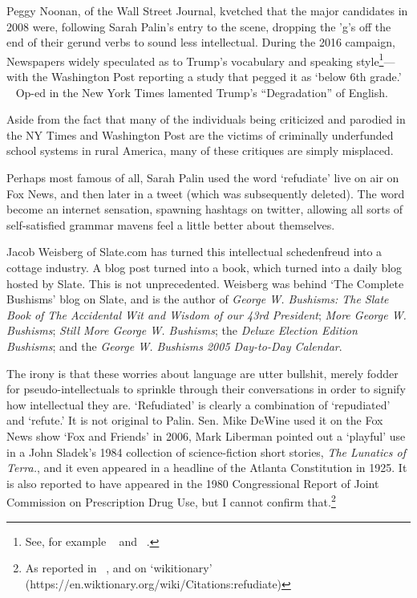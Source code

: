 Peggy Noonan, of the Wall Street Journal, kvetched that the major candidates in 2008 were, following Sarah Palin's entry to the scene, dropping the 'g's off the end of their gerund verbs to sound less intellectual. During the 2016 campaign, Newspapers widely speculated as to Trump's vocabulary and speaking style\footnote{See, for example ~\citep{Shafer:2015ug} and ~\citep{Leith:2017um}.}---with the Washington Post reporting a study that pegged it as `below 6th grade.' ~\citep{Moyer:2016us} Op-ed in the New York Times lamented Trump's ``Degradation'' of English. ~\citep{Blow:2017uk}

Aside from the fact that many of the individuals being criticized and parodied in the NY Times and Washington Post are the victims of criminally underfunded school systems in rural America, many of these critiques are simply misplaced.

Perhaps most famous of all, Sarah Palin used the word `refudiate' live on air on Fox News, and then later in a tweet (which was subsequently deleted). The word become an internet sensation, spawning hashtags on twitter, allowing all sorts of self-satisfied grammar mavens feel a little better about themselves.

Jacob Weisberg of Slate.com has turned this intellectual schedenfreud into a cottage industry. A blog post turned into a book, which turned into a daily blog hosted by Slate. This is not unprecedented. Weisberg was behind `The Complete Bushisms' blog on Slate, and is the author of \emph{George W. Bushisms: The Slate Book of The Accidental Wit and Wisdom of our 43rd President}; \emph{More George W. Bushisms}; \emph{Still More George W. Bushisms}; the \emph{Deluxe Election Edition Bushisms}; and the \emph{George W. Bushisms 2005 Day-to-Day Calendar}. 

The irony is that these worries about language are utter bullshit, merely fodder for pseudo-intellectuals to sprinkle through their conversations in order to signify how intellectual they are. `Refudiated' is clearly a combination of `repudiated' and `refute.' It is not original to Palin. Sen. Mike DeWine used it on the Fox News show `Fox and Friends' in 2006, Mark Liberman pointed out a `playful' use in a John Sladek's 1984 collection of science-fiction short stories, \emph{The Lunatics of Terra.}, and it even appeared in a headline of the Atlanta Constitution in 1925. It is also reported to have appeared in the 1980 Congressional Report of Joint Commission on Prescription Drug Use, but I cannot confirm that.\footnote{As reported in ~\citep{K:2010uj}, and on `wikitionary' (https:\slash \slash en.wiktionary.org\slash wiki\slash Citations:refudiate)}


